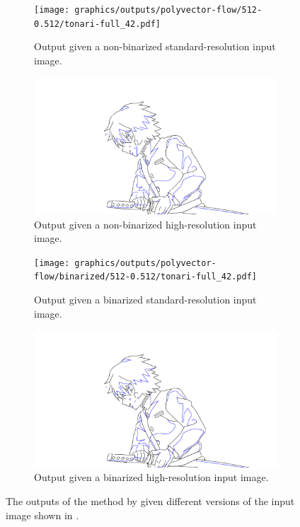 \begin{figure}
    \centering
    \begin{subfigure}{.45\textwidth}
        \texttt{[image: graphics/outputs/polyvector-flow/512-0.512/tonari-full\_42.pdf]}
        \caption{Output given a non-binarized standard-resolution input image.}
    \end{subfigure}
    \begin{subfigure}{.45\textwidth}
        \includegraphics[width=\textwidth]{graphics/outputs/polyvector-flow/1024-1.024/tonari-full_42.pdf}
        \caption{Output given a non-binarized high-resolution input image.}
    \end{subfigure}
    \begin{subfigure}{.45\textwidth}
        \texttt{[image: graphics/outputs/polyvector-flow/binarized/512-0.512/tonari-full\_42.pdf]}
        \caption{Output given a binarized standard-resolution input image.}
    \end{subfigure}
    \begin{subfigure}{.45\textwidth}
        \includegraphics[width=\textwidth]{graphics/outputs/polyvector-flow/binarized/1024-1.024/tonari-full_42.pdf}
        \caption{Output given a binarized high-resolution input image.}
    \end{subfigure}
    \caption{The outputs of the method by \citet{Puhachov2021KeypointPolyvector} given different versions of the input image shown in .}
    \label{fig:tonari-full_42_full.polyvector.combinations}
\end{figure}

